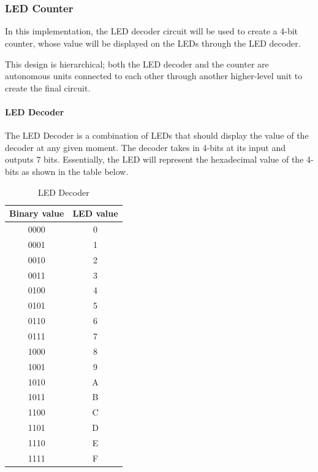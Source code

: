 \part{}

\section{LED Counter}

In this implementation, the LED decoder circuit will be used to create a 4-bit counter, whose value will be displayed on 
the LEDs through the LED decoder.

This design is hierarchical; both the LED decoder and the counter are autonomous units connected to each other through 
another higher-level unit to create the final circuit.

\subsection{LED Decoder}

The LED Decoder is a combination of LEDs that should display the value of the decoder at any given moment. The decoder 
takes in 4-bits at its input and outputs 7 bits. Essentially, the LED will represent the hexadecimal value of the 4-bits 
as shown in the table below.

\begin{table}[H]
    \centering
    \begin{tabular}{|c|c|}
        \hline
        Binary value & LED value \\ \hline \hline
        0000 & 0 \\ \hline
        0001 & 1 \\ \hline
        0010 & 2 \\ \hline
        0011 & 3 \\ \hline
        0100 & 4 \\ \hline
        0101 & 5 \\ \hline
        0110 & 6 \\ \hline
        0111 & 7 \\ \hline
        1000 & 8 \\ \hline
        1001 & 9 \\ \hline
        1010 & A \\ \hline
        1011 & B \\ \hline
        1100 & C \\ \hline
        1101 & D \\ \hline
        1110 & E \\ \hline
        1111 & F \\ \hline
    \end{tabular}
    \caption{LED Decoder}
    \label{tab:led_decoder}
\end{table}

